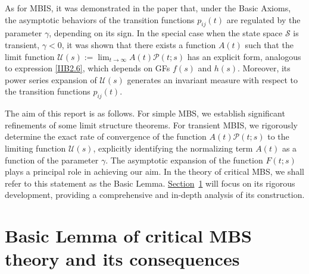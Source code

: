 \documentclass[10pt,reqno]{amsart}
\theoremstyle{definition}
\numberwithin{equation}{section}
\begin{document}
    As for MBIS, it was demonstrated in the paper {\cite{ImUfa21}} that, under the Basic Axioms, the asymptotic
    behaviors of the transition functions ${{p}_{ij}}(t)$ are regulated by the parameter $\gamma$, depending
    on its sign. In the special case when the state space $\mathcal{S}$ is transient, $\gamma<0$, it was shown
    that there exists a function $A(t)$ such that the limit function
    $\mathcal{U}(s):=\lim_{t\to\infty}A(t)\mathcal{P}(t;s)$ has an explicit form, analogous to
    expression {\eqref{IIB2.6}}, which depends on GFs $f(s)$ and $h(s)$. Moreover, its power series
    expansion of $\mathcal{U}(s)$ generates an invariant measure with respect to the transition
    functions ${{p}_{ij}}(t)$.

    The aim of this report is as follows. For simple MBS, we establish significant
    refinements of some limit structure theorems. For transient MBIS, we rigorously determine the exact rate
    of convergence of the function $A(t)\mathcal{P}(t;s)$ to the limiting function $\mathcal{U}(s)$, explicitly
    identifying the normalizing term $A(t)$ as a function of the parameter $\gamma$. The asymptotic expansion
    of the function $F(t;s)$ plays a principal role in achieving our aim. In the theory of critical MBS,
    we shall refer to this statement as the Basic Lemma. {\hyperref[IIBSec3]{Section}~\ref{IIBSec3}} will
    focus on its rigorous development, providing a comprehensive and in-depth analysis of its construction.





\section{\textbf{Basic Lemma of critical MBS theory and its consequences}}             \label{IIBSec3}
\end{document}
